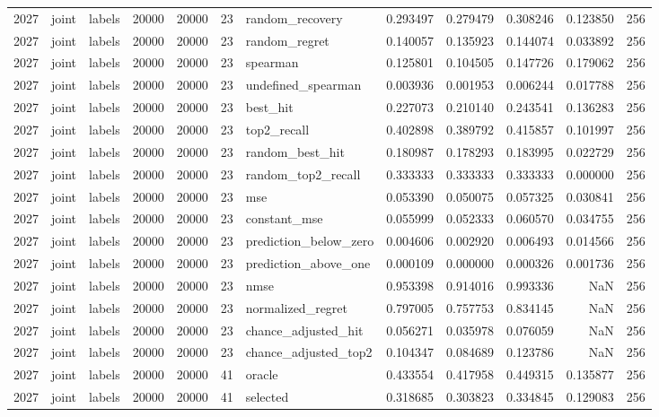 \begin{tabular}{rllrrrlrrrrr}
2027 & joint & labels & 20000 & 20000 & 23 & random_recovery & 0.293497 & 0.279479 & 0.308246 & 0.123850 & 256 \\
2027 & joint & labels & 20000 & 20000 & 23 & random_regret & 0.140057 & 0.135923 & 0.144074 & 0.033892 & 256 \\
2027 & joint & labels & 20000 & 20000 & 23 & spearman & 0.125801 & 0.104505 & 0.147726 & 0.179062 & 256 \\
2027 & joint & labels & 20000 & 20000 & 23 & undefined_spearman & 0.003936 & 0.001953 & 0.006244 & 0.017788 & 256 \\
2027 & joint & labels & 20000 & 20000 & 23 & best_hit & 0.227073 & 0.210140 & 0.243541 & 0.136283 & 256 \\
2027 & joint & labels & 20000 & 20000 & 23 & top2_recall & 0.402898 & 0.389792 & 0.415857 & 0.101997 & 256 \\
2027 & joint & labels & 20000 & 20000 & 23 & random_best_hit & 0.180987 & 0.178293 & 0.183995 & 0.022729 & 256 \\
2027 & joint & labels & 20000 & 20000 & 23 & random_top2_recall & 0.333333 & 0.333333 & 0.333333 & 0.000000 & 256 \\
2027 & joint & labels & 20000 & 20000 & 23 & mse & 0.053390 & 0.050075 & 0.057325 & 0.030841 & 256 \\
2027 & joint & labels & 20000 & 20000 & 23 & constant_mse & 0.055999 & 0.052333 & 0.060570 & 0.034755 & 256 \\
2027 & joint & labels & 20000 & 20000 & 23 & prediction_below_zero & 0.004606 & 0.002920 & 0.006493 & 0.014566 & 256 \\
2027 & joint & labels & 20000 & 20000 & 23 & prediction_above_one & 0.000109 & 0.000000 & 0.000326 & 0.001736 & 256 \\
2027 & joint & labels & 20000 & 20000 & 23 & nmse & 0.953398 & 0.914016 & 0.993336 & NaN & 256 \\
2027 & joint & labels & 20000 & 20000 & 23 & normalized_regret & 0.797005 & 0.757753 & 0.834145 & NaN & 256 \\
2027 & joint & labels & 20000 & 20000 & 23 & chance_adjusted_hit & 0.056271 & 0.035978 & 0.076059 & NaN & 256 \\
2027 & joint & labels & 20000 & 20000 & 23 & chance_adjusted_top2 & 0.104347 & 0.084689 & 0.123786 & NaN & 256 \\
2027 & joint & labels & 20000 & 20000 & 41 & oracle & 0.433554 & 0.417958 & 0.449315 & 0.135877 & 256 \\
2027 & joint & labels & 20000 & 20000 & 41 & selected & 0.318685 & 0.303823 & 0.334845 & 0.129083 & 256 \\

\end{tabular}
